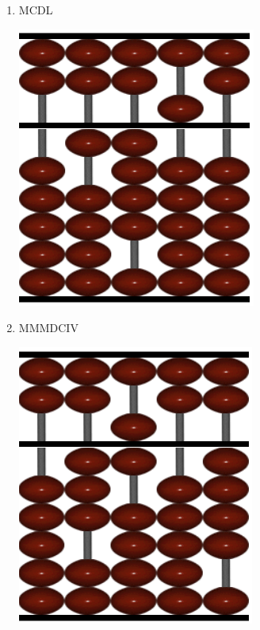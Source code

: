 \documentclass[a4paper]{article}
\begin{document}
\begin{enumerate}
\begin{enumerate}
            \item MCDL
            \begin{center}
                \includegraphics[scale=0.6]{2d}
            \end{center}
            
            \vspace{0.5cm}

            \item MMMDCIV
            \begin{center}
                \includegraphics[scale=0.6]{2e}
            \end{center}
        
        \end{enumerate}

        \vspace{2cm}
        


\end{enumerate}
\end{document}

